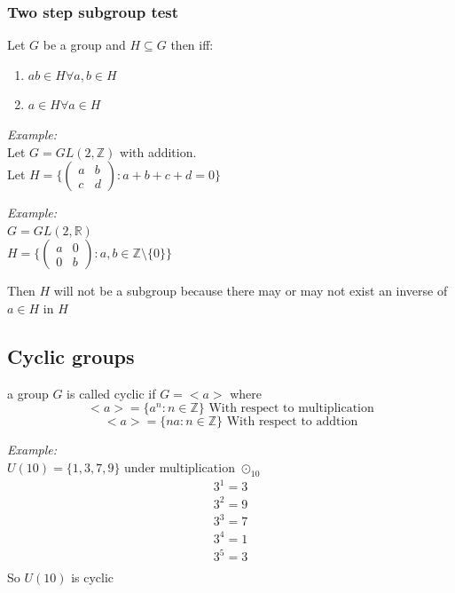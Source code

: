 \documentclass[11pt,letterpaper]{article}
\newenvironment{example}                             
        {\noindent\textit{Example:}\\}
	{}
\begin{document}
\subsubsection{Two step subgroup test}
Let $G$ be a group and $H \subseteq G$ then iff: 
\begin{enumerate}
  \item $ab \in H \forall a, b \in H$
  \item $a \in H \forall a \in H$
\end{enumerate}

\begin{example}
  Let $G = GL(2,\mathbb{Z})$ with addition. \\ 
  Let $H = \Big\{ \begin{pmatrix} a & b \\ c & d \end{pmatrix} : a + b + c + d = 0 \Big\}$
\end{example}

\begin{example}
  $G = GL(2,\mathbb{R})$\\
  $H = \Big \{ \begin{pmatrix}
      a & 0 \\ 
      0 & b 
  \end{pmatrix} : a,b \in \mathbb{Z}\setminus \{0\} \Big\}$

  Then $H$ will not be a subgroup because there may or may not exist an inverse of $a \in H$ in $H$
\end{example}

\subsection{Cyclic groups}
a group $G$ is called cyclic if $G = <a>$ where 
\[
  <a> = \{a^n : n \in \mathbb{Z} \} \text{ With respect to multiplication}
\]
\[
  <a> = \{na : n \in \mathbb{Z} \} \text{ With respect to addtion}
\]

\begin{example}
  $U(10) = \{1,3,7,9\}$ under multiplication $\odot_{10}$
  \begin{align*}
    3^1 = 3\\
    3^2 = 9\\
    3^3 = 7\\
    3^4 = 1\\
    3^5 = 3\\
  \end{align*}
  So $U(10)$ is cyclic
\end{example}
\end{document}
